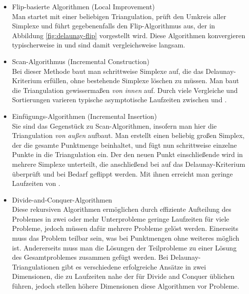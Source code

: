 \begin{itemize}
\item Flip-basierte Algorithmen (Local Improvement)\\
  Man startet mit einer beliebigen Triangulation, prüft den Umkreis aller Simplexe und führt gegebenenfalls den Flip-Algorithmus aus, der in Abbildung \ref{fig:delaunay-flip} vorgestellt wird.
  Diese Algorithmen konvergieren typischerweise in  und sind damit vergleichsweise langsam.

\item Scan-Algorithmus (Incremental Construction)\\
  Bei dieser Methode baut man schrittweise Simplexe auf, die das Delaunay-Kriterium erfüllen, ohne bestehende Simplexe löschen zu müssen.
  Man baut die Triangulation gewissermaßen \textit{von innen} auf.
  Durch viele Vergleiche und Sortierungen varieren typische asymptotische Laufzeiten zwischen  und .

\item Einfügungs-Algorithmen (Incremental Insertion)\\
  Sie sind das Gegenstück zu Scan-Algorithmen, insofern man hier die Triangulation \textit{von außen} aufbaut.
  Man erstellt einen beliebig großen Simplex, der die gesamte Punktmenge beinhaltet, und fügt nun schrittweise einzelne Punkte in die Triangulation ein.
  Der den neuen Punkt einschließende wird in mehrere Simplexe unterteilt, die anschließend bei auf das Delaunay-Kriterium überprüft und bei Bedarf geflippt werden.
  Mit ihnen erreicht man geringe Laufzeiten von .

\item Divide-and-Conquer-Algorithmen\\
  Diese rekursiven Algorithmen ermöglichen durch effiziente Aufteilung des Problemes in zwei oder mehr Unterprobleme geringe Laufzeiten für viele Probleme, jedoch müssen dafür mehrere Probleme gelöst werden.
  Einerseits muss das Problem teilbar sein, was bei Punktmengen ohne weiteres möglich ist.
  Andererseits muss man die Lösungen der Teilprobleme zu einer Lösung des Gesamtproblemes zusammen gefügt werden.
  Bei Delaunay-Triangulationen gibt es verschiedene erfolgreiche Ansätze in zwei Dimensionen, die zu Laufzeiten nahe der für Divide and Conquer üblichen  führen, jedoch stellen höhere Dimensionen diese Algorithmen vor Probleme.


\end{itemize}
